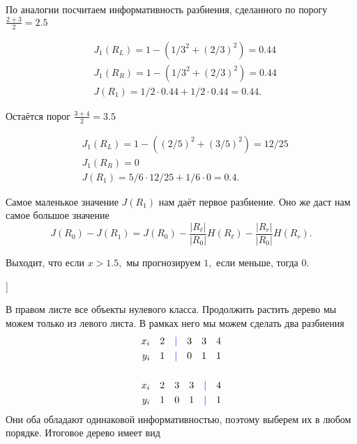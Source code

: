 \documentclass[12pt,a4paper]{article}
\begin{document}
\begin{esSolution}
    По аналогии посчитаем информативность разбиения, сделанного по порогу $\frac{2 + 3}{2} = 2.5$
    
    \[ \begin{aligned}
    & J_1(R_L) = 1 - (1/3^2 + (2/3)^2) = 0.44 \\
    & J_1(R_R) = 1 - (1/3^2 + (2/3)^2) = 0.44 \\
    & J(R_1) = 1/2 \cdot 0.44 + 1/2 \cdot 0.44 = 0.44.
    \end{aligned} \]

    Остаётся порог $\frac{3 + 4}{2} = 3.5$

    \[ \begin{aligned}
    & J_1(R_L) = 1 - ((2/5)^2 + (3/5)^2) = 12/25 \\
    & J_1(R_R) = 0 \\
    & J(R_1) = 5/6 \cdot 12/25 + 1/6 \cdot 0 = 0.4.
    \end{aligned} \]

    Самое маленькое значение $J(R_1)$ нам даёт первое разбиение. Оно же даст нам самое большое значение \[J(R_0) - J(R_1) = J(R_0) - \frac{|R_\ell|}{|R_0|} H(R_\ell) -\frac{|R_r|}{|R_0|} H(R_r).\]
    
    Выходит, что если $x > 1.5,$ мы прогнозируем $1,$ если меньше, тогда $0$. 
    \begin{center}
    \begin{forest}
      [$x>1.5$, rectangle, draw
        [$0$, circle, draw]
        [$1$, circle, draw
        ]
      ]
    \end{forest}
    \end{center} 
    В правом листе все объекты нулевого класса. Продолжить растить дерево мы можем только из левого листа. В рамках него мы можем сделать два разбиения 
    \[ 
    \begin{aligned}
    x_i \quad 2 \quad {\color{blue}|} \quad 3 \quad 3 \quad 4 \\ 
    y_i \quad 1 \quad {\color{blue}|} \quad 0 \quad 1 \quad 1 \\ \mbox{ } \\ 
    x_i \quad 2 \quad 3 \quad 3 \quad {\color{blue}|} \quad 4 \\ 
    y_i \quad 1 \quad 0 \quad 1 \quad {\color{blue}|} \quad 1 \\
    \end{aligned}
    \]
    Они оба обладают одинаковой информативностью, поэтому выберем их в любом порядке. Итоговое дерево имеет вид 
    

\end{esSolution}
\end{document}
